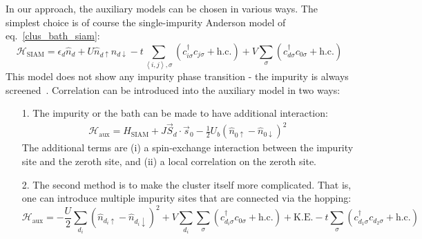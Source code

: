 \documentclass[prb]{revtex4-2}
\begin{document}
In our approach, the auxiliary models can be chosen in various ways. The simplest choice is of course the single-impurity Anderson model of eq.~\ref{clus_bath_siam}:
\begin{equation}
\mathcal{H}_\text{SIAM} = \epsilon_d \hat n_d + U \hat n_{d \uparrow} \hat n_{d \downarrow} - t\sum_{\left<i,j \right>, \sigma}\left(c^\dagger_{i\sigma}c_{j\sigma} + \text{h.c.}\right) + V\sum_\sigma \left( c^\dagger_{d\sigma}c_{0\sigma} + \text{h.c.}\right) 
\end{equation}
This model does not show any impurity phase transition - the impurity is always screened~\cite{hrk_wilson_1980,wilson1975,bullaNRGreview}. Correlation can be introduced into the auxiliary model in two ways:
\begin{itemize}
	\item[1.] The impurity or the bath can be made to have additional interaction: 
\begin{gather}
\mathcal{H}_\text{aux} = H_\text{SIAM} + J \vec{S}_d\cdot\vec{s}_0 - \frac{1}{2}U_b \left(\hat n_{0 \uparrow} - \hat n_{0 \downarrow}\right)^2
\end{gather}
The additional terms are (i) a spin-exchange interaction between the impurity site and the zeroth site, and (ii) a local correlation on the zeroth site.
\item[2.] The second method is to make the cluster itself more complicated. That is, one can introduce multiple impurity sites that are connected via the hopping:
\begin{equation}
\mathcal{H}_\text{aux} = -\frac{U}{2}\sum_{d_i}\left(\hat n_{d_i \uparrow} - \hat n_{d_i \downarrow}\right) ^2 + V\sum_{d_i}\sum_\sigma\left( c^\dagger_{d_i\sigma}c_{0\sigma} + \text{h.c.} \right) + \text{K.E.} - t\sum_{\sigma}\left(c^\dagger_{d_1\sigma}c_{d_2\sigma} + \text{h.c.}\right)
\end{equation}
	
\end{itemize}
\end{document}
